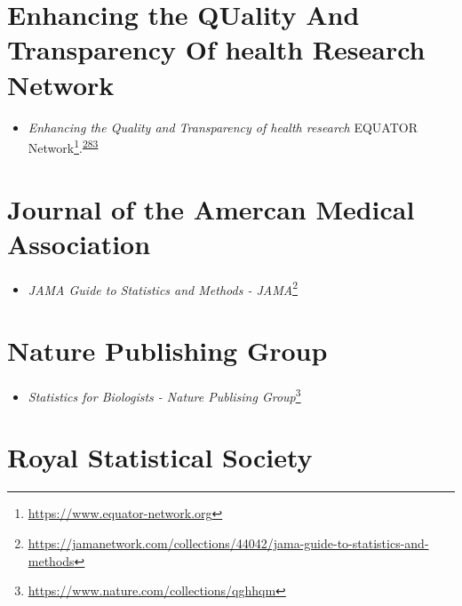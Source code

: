 \documentclass[
  a4paper,
]{book}
\providecommand{\tightlist}{%
  \setlength{\itemsep}{0pt}\setlength{\parskip}{0pt}}
\renewcommand{\href}[2]{#2\footnote{\url{#1}}}
\begin{document}
\hypertarget{enhancing-the-quality-and-transparency-of-health-research-network}{%
\section*{Enhancing the QUality And Transparency Of health Research Network}\label{enhancing-the-quality-and-transparency-of-health-research-network}}

\begin{itemize}
\tightlist
\item
  \emph{Enhancing the Quality and Transparency of health research} \href{https://www.equator-network.org}{EQUATOR Network}.\textsuperscript{\protect\hyperlink{ref-Altman2008}{283}}
\end{itemize}

\hypertarget{journal-of-the-amercan-medical-association}{%
\section*{Journal of the Amercan Medical Association}\label{journal-of-the-amercan-medical-association}}

\begin{itemize}
\tightlist
\item
  \href{https://jamanetwork.com/collections/44042/jama-guide-to-statistics-and-methods}{\emph{JAMA Guide to Statistics and Methods - JAMA}}
\end{itemize}

\hypertarget{nature-publishing-group}{%
\section*{Nature Publishing Group}\label{nature-publishing-group}}

\begin{itemize}
\tightlist
\item
  \href{https://www.nature.com/collections/qghhqm}{\emph{Statistics for Biologists - Nature Publising Group}}
\end{itemize}

\hypertarget{royal-statistical-society}{%
\section*{Royal Statistical Society}\label{royal-statistical-society}}
\end{document}

